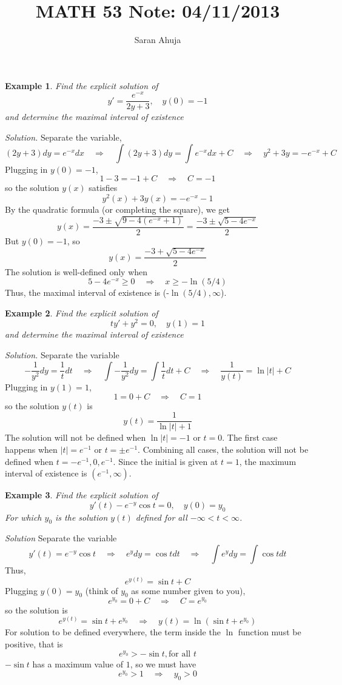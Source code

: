 \documentclass[10pt]{amsart}
\title{MATH 53 Note: 04/11/2013}
\author{Saran Ahuja}
\newtheorem{example}{Example}
\renewcommand{\ni}{\noindent}
\newcommand{\ti}{\textit}
\newcommand{\imply}{ \quad \Rightarrow \quad}
\newcommand{\bex}{\begin{example}}
\newcommand{\eex}{\end{example}}
\begin{document}
\maketitle

\bex Find the explicit solution of
$$ y' = \frac{e^{-x}}{2y+3},\quad y(0) = -1 $$
and determine the maximal interval of existence
\eex 
\ni\ti{Solution. } Separate the variable,
$$  (2y+3)dy = e^{-x}dx \imply \int (2y+3)dy = \int e^{-x}dx + C \imply y^{2}+3y = -e^{-x}+C $$
Plugging in $y(0) = -1$,
$$ 1-3 = -1+C \imply C = -1 $$
so the solution $y(x)$ satisfies
$$ y^{2}(x) + 3y(x) = -e^{-x}-1 $$
By the quadratic formula (or completing the square), we get
$$ y(x) = \frac{-3 \pm \sqrt{9-4(e^{-x}+1)}}{2} = \frac{-3 \pm \sqrt{5-4e^{-x}}}{2} $$
But $y(0)=-1$, so 
$$ y(x) = \frac{-3 + \sqrt{5-4e^{-x}}}{2} $$
The solution is well-defined only when 
$$5-4e^{-x} \geq 0 \imply x \geq -\ln(5/4)$$
Thus, the maximal interval of existence is (-$\ln(5/4),\infty$).
 
\vspace{0.2in}
\bex Find the explicit solution of
$$ ty' + y^{2} = 0, \quad y(1) = 1$$
and determine the maximal interval of existence
\eex 
\ni\ti{Solution. } Separate the variable
$$ -\frac{1}{y^{2}}dy = \frac{1}{t}dt \imply  \int-\frac{1}{y^{2}}dy = \int \frac{1}{t}dt + C \imply \frac{1}{y(t)} = \ln |t| + C $$
Plugging in $y(1) = 1$,
$$ 1 = 0 + C  \imply C =1 $$
so the solution $y(t)$ is
$$ y(t) = \frac{1}{\ln |t| + 1 } $$
The solution will not be defined when $\ln|t| = -1$ or $t = 0$. The first case happens when $|t| = e^{-1}$ or $t = \pm e^{-1}$. Combining all cases, the solution will not be defined when $t = -e^{-1},0,e^{-1}$. Since the initial is given at $t=1$, the maximum interval of existence is $(e^{-1},\infty)$.

\vspace{0.2in}
\bex Find the explicit solution of 
$$ y'(t) - e^{-y}\cos t = 0, \quad y(0) = y_{0} $$
For which $y_{0}$ is the solution $y(t)$ defined for all $-\infty < t < \infty$.
\eex 
\ni\ti{Solution} Separate the variable 
$$ y'(t) = e^{-y}\cos t \imply e^{y}dy = \cos t dt \imply \int e^{y}dy = \int \cos t dt $$
Thus,
$$ e^{y(t)} = \sin t + C $$
Plugging $y(0) = y_{0}$ (think of $y_{0}$ as some number given to you), 
$$ e^{y_{0}} = 0 + C \imply C = e^{y_{0}} $$
so the solution is
$$ e^{y(t)} = \sin t + e^{y_{0}} \imply y(t) = \ln ( \sin t + e^{y_{0}} ) $$
For solution to be defined everywhere, the term inside the $\ln $ function must be positive, that is
$$  e^{y_{0}} > -\sin t, \text{for all }t $$
$- \sin t$ has a maximum value of $1$, so we must have 
$$  e^{y_{0}}  > 1 \imply y_{0} > 0 $$
\end{document}
